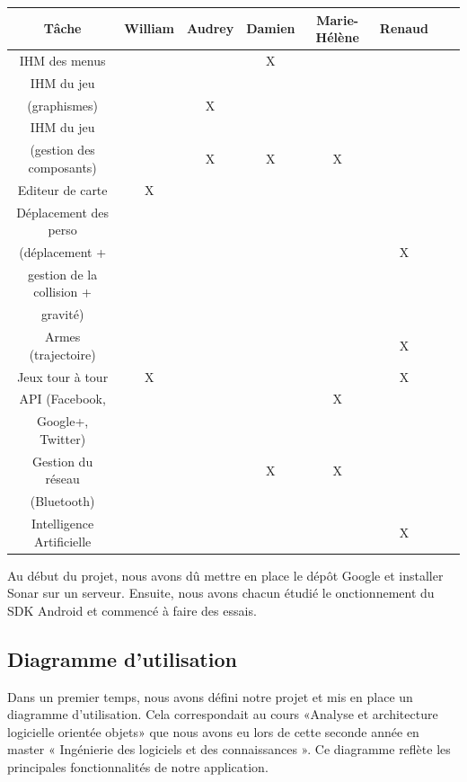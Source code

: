 \documentclass{report}
\begin{document}
\begin{tabular}{|c|c|c|c|c|c|c|c|}
\hline
{\bf Tâche } & {\bf William } & {\bf Audrey } & {\bf Damien } & {\bf Marie-Hélène } & {\bf Renaud }\\
\hline
{IHM des menus} & {} & {} & {X} & {} & {}\\
\hline
{IHM du jeu} & {} & {} & {} & {} & {} \\
{(graphismes)} & {} & {X} & {} & {} & {} \\
\hline
{IHM du jeu} & {} & {} & {} & {} & {}\\
{(gestion des composants)} & {} & {X} & {X} & {X} & {} \\
\hline
{Editeur de carte} & {X} & {} & {} & {} & {} \\
\hline
Déplacement des perso &&&&&\\
(déplacement + &&&&& X\\
gestion de la collision + &&&&&\\
 gravité) &&&&&\\
\hline
{Armes (trajectoire)} & {} & {} & {} & {} & {X} \\
\hline
{Jeux tour à tour} & {X} & {} & {} & {} & {X} \\
\hline
{API (Facebook,} & {} & {} & {} & {X} & {} \\
{ Google+, Twitter)} & {} & {} & {} & {} & {} \\
\hline
{Gestion du réseau} & {} & {} & {X} & {X} & {} \\
{(Bluetooth)} & {} & {} & {} & {} & {} \\
\hline
{Intelligence Artificielle} & {} & {} & {} & {} & {X}\\
\hline
\end{tabular}
\bigskip


Au début du projet, nous avons dû mettre en place le dépôt Google et
installer Sonar sur un serveur. Ensuite, nous avons chacun étudié le
onctionnement du SDK Android et commencé à faire des essais.

\subsection{Diagramme d’utilisation}

Dans un premier temps, nous avons défini notre projet et mis en place un
diagramme d’utilisation. Cela correspondait au cours «Analyse et
architecture logicielle orientée objets» que nous avons eu lors de cette
seconde année en master « Ingénierie des logiciels et des
connaissances ». Ce diagramme reflète les principales fonctionnalités
de notre application.
\end{document}
